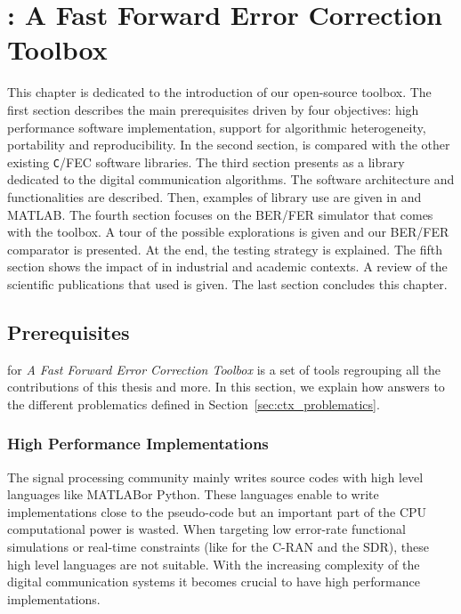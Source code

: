 
\renewcommand{\curChapter}{main/chapter3}

\chapter{\AFFECT: A Fast Forward Error Correction Toolbox}
\label{chap:aff3ct}

This chapter is dedicated to the introduction of our \AFFECT open-source
toolbox. The first section describes the main prerequisites driven by four
objectives: high performance software implementation, support for algorithmic
heterogeneity, portability and reproducibility. In the second section, \AFFECT
is compared with the other existing \verb|C|/\Cxx FEC software libraries. The
third section presents \AFFECT as a library dedicated to the digital
communication algorithms. The software architecture and functionalities are
described. Then, examples of library use are given in \Cxx and MATLAB\R. The
fourth section focuses on the \AFFECT BER/FER simulator that comes with the
toolbox. A tour of the possible explorations is given and our BER/FER comparator
is presented. At the end, the \AFFECT testing strategy is explained. The fifth
section shows the impact of \AFFECT in industrial and academic contexts. A
review of the scientific publications that used \AFFECT is given. The last
section concludes this chapter.

\vspace*{\fill}
\minitoccustom
\vspace*{\fill}

\newpage
\section{Prerequisites}

\AFFECT for \emph{A Fast Forward Error Correction Toolbox} is a set of tools
regrouping all the contributions of this thesis and more. In this section, we
explain how \AFFECT answers to the different problematics defined in
Section~\ref{sec:ctx_problematics}.

\subsection{High Performance Implementations}

The signal processing community mainly writes source codes with high level
languages like MATLAB\R or Python. These languages enable to write
implementations close to the pseudo-code but an important part of the CPU
computational power is wasted. When targeting low error-rate functional
simulations or real-time constraints (like for the C-RAN and the SDR), these
high level languages are not suitable. With the increasing complexity of the
digital communication systems it becomes crucial to have high performance
implementations.

